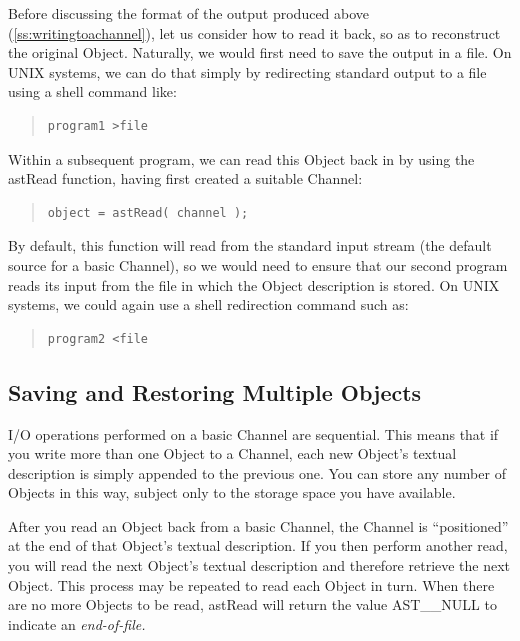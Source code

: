 \documentclass[twoside,11pt]{article}
\newcommand{\htmlref}[2]{#1}
\newcommand{\secref}[1]{\S\ref{#1}}
\renewcommand{\secref}[1]{\ref{#1}}
\begin{document}
Before discussing the format of the output produced above
(\secref{ss:writingtoachannel}), let us consider how to read it back,
so as to reconstruct the original \htmlref{Object}{Object}. Naturally, we would first
need to save the output in a file. On UNIX systems, we can do that
simply by redirecting standard output to a file using a shell command
like:

\begin{quote}
\small
\begin{verbatim}
program1 >file
\end{verbatim}
\normalsize
\end{quote}

Within a subsequent program, we can read this Object back in by
using the \htmlref{astRead}{astRead} function, having first created a suitable
\htmlref{Channel}{Channel}:

\begin{quote}
\small
\begin{verbatim}
object = astRead( channel );
\end{verbatim}
\normalsize
\end{quote}

By default, this function will read from the standard input stream
(the default source for a basic Channel), so we would need to ensure
that our second program reads its input from the file in which the
Object description is stored. On UNIX systems, we could again use a
shell redirection command such as:

\begin{quote}
\small
\begin{verbatim}
program2 <file
\end{verbatim}
\normalsize
\end{quote}

\subsection{Saving and Restoring Multiple Objects}

I/O operations performed on a basic \htmlref{Channel}{Channel} are sequential. This
means that if you write more than one \htmlref{Object}{Object} to a Channel,
each new Object's textual description is simply appended to the
previous one. You can store any number of Objects in this way,
subject only to the storage space you have available.

After you read an Object back from a basic Channel, the
Channel is ``positioned'' at the end of that Object's
textual description. If you then perform another read, you will
read the next Object's textual description and therefore
retrieve the next Object.  This process may be repeated to read
each Object in turn. When there are no more Objects to be
read, \htmlref{astRead}{astRead} will return the value AST\_\_NULL to indicate an
{\em{end-of-file.}}
\end{document}
